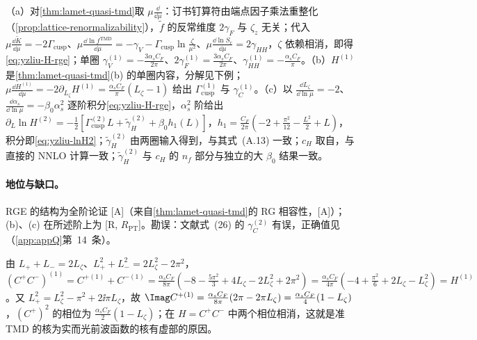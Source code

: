 \begin{proofsketch}
（a）对\cref{thm:lamet-quasi-tmd}取 $\mu\frac{\dd}{\dd\mu}$：订书钉算符由端点因子乘法重整化（\cref{prop:lattice-renormalizability}），$\tilde f$ 的反常维度 $2\gamma_F$ 与 $\zeta_z$ 无关；代入 $\mu\frac{\dd\tilde K}{\dd\mu}=-2\Gamma_{\mathrm{cusp}}$、$\mu\frac{\dd\ln f^{\mathrm{TMD}}}{\dd\mu}=-\gamma_V-\Gamma_{\mathrm{cusp}}\ln\frac{\zeta}{\mu^2}$、$\mu\frac{\dd\ln S_r}{\dd\mu}=2\gamma_{HH}$，$\zeta$ 依赖相消，即得\cref{eq:yzliu-H-rge}；单圈 $\gamma_V^{(1)}=-\frac{3\alpha_sC_F}{2\pi}$、$2\gamma_F^{(1)}=\frac{3\alpha_sC_F}{2\pi}$、$\gamma_{HH}^{(1)}=-\frac{\alpha_sC_F}{\pi}$。（b）$H^{(1)}$ 是\cref{thm:lamet-quasi-tmd}(b) 的单圈内容，分解见下例；$\mu\frac{\dd H^{(1)}}{\dd\mu}=-2\partial_{L_\zeta}H^{(1)}=\frac{\alpha_sC_F}{\pi}(L_\zeta-1)$ 给出 $\Gamma^{(1)}_{\mathrm{cusp}}$ 与 $\gamma^{(1)}_C$。（c）以 $\frac{\dd L_\zeta}{\dd\ln\mu}=-2$、$\frac{\dd\alpha_s}{\dd\ln\mu}=-\beta_0\alpha_s^2$ 逐阶积分\cref{eq:yzliu-H-rge}，$\alpha_s^2$ 阶给出 $\partial_L\ln H^{(2)}=-\frac12[\Gamma^{(2)}_{\mathrm{cusp}}L+\tilde\gamma^{(2)}_H+\beta_0h_1(L)]$，$h_1=\frac{C_F}{2\pi}(-2+\frac{\pi^2}{12}-\frac{L^2}{2}+L)$，积分即\cref{eq:yzliu-lnH2}；$\tilde\gamma^{(2)}_H$ 由两圈输入\cite[式~(A.1)--(A.5)、(A.11)]{Ji:2023pba}得到，与其式~(A.13) 一致；$c_H$ 取自\cite[式~(5.11)]{Ji:2023pba}，与直接的 NNLO 计算\cite{delRio:2023pse}一致；$\tilde\gamma^{(2)}_H$ 与 $c_H$ 的 $n_f$ 部分与独立的大 $\beta_0$ 结果\cite[式~(2.41)--(2.42)]{Liu:2023onm}一致。
\end{proofsketch}

\paragraph{地位与缺口。}RGE 的结构为全阶论证 [A]（来自\cref{thm:lamet-quasi-tmd}的 RG 相容性，[A]）；(b)、(c) 在所述阶上为 [R, $R_{\mathrm{PT}}$]。勘误：文献\cite{Ji:2019ewn}式~(26) 的 $\gamma^{(2)}_C$ 有误，正确值见\cite[式~(A.12)--(A.13)]{Ji:2023pba}（\cref{app:appQ}第~14~条）。

\begin{example}[单圈 $H=C^+_{HL}C^-_{HL}$ 与相位]\label{ex:yzliu-hl-decomposition}
由 $L_++L_-=2L_\zeta$、$L_+^2+L_-^2=2L_\zeta^2-2\pi^2$，$(C^+C^-)^{(1)}=C^{+(1)}+C^{-(1)}=\frac{\alpha_sC_F}{8\pi}(-8-\frac{5\pi^2}{3}+4L_\zeta-2L_\zeta^2+2\pi^2)=\frac{\alpha_sC_F}{4\pi}(-4+\frac{\pi^2}{6}+2L_\zeta-L_\zeta^2)=H^{(1)}$。又 $L_+^2=L_\zeta^2-\pi^2+2\ii\pi L_\zeta$，故 $\Imag C^{+(1)}=\frac{\alpha_sC_F}{8\pi}(2\pi-2\pi L_\zeta)=\frac{\alpha_sC_F}{4}(1-L_\zeta)$，$(C^+)^2$ 的相位为 $\frac{\alpha_sC_F}{2}(1-L_\zeta)$；在 $H=C^+C^-$ 中两个相位相消，这就是准 TMD 的核为实而光前波函数的核有虚部的原因。
\end{example}

